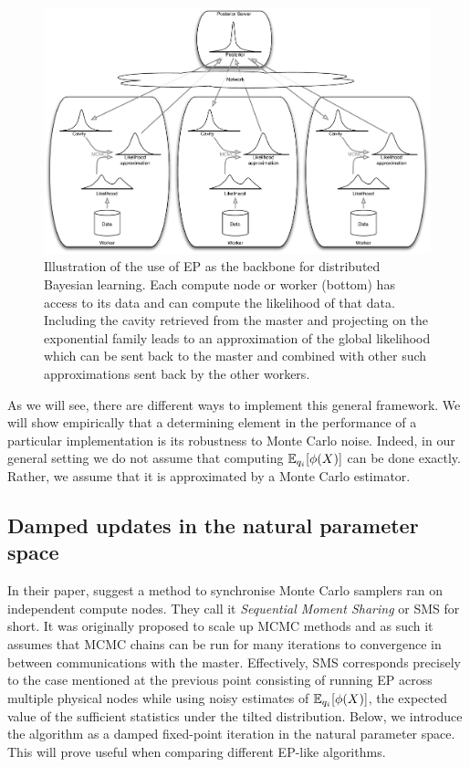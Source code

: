 \begin{figure}[!h]
	\center
	\includegraphics[width=\textwidth]{figures/snep/PosteriorServer}
	\caption{\label{fig:SNEP-arch} Illustration of the use of EP as the backbone for distributed Bayesian learning. Each compute node or worker (bottom) has access to its data and can compute the likelihood of that data. Including the cavity retrieved from the master and projecting on the exponential family leads to an approximation of the global likelihood which can be sent back to the master and combined with other such approximations sent back by the other workers.}
\end{figure}

As we will see, there are different ways to implement this general framework.
We will show empirically that a determining element in the performance of a particular implementation is its robustness to Monte Carlo noise. 
Indeed, in our general setting we do not assume that computing $\mathbb E_{q_i}[\phi(X)]$ can be done exactly. Rather, we assume that it is approximated by a Monte Carlo estimator.

\subsection{Damped updates in the natural parameter space}
In their paper, \citet{xu14} suggest a method to synchronise Monte Carlo samplers ran on independent compute nodes. They call it \emph{Sequential Moment Sharing} or SMS for short. It was originally proposed to scale up MCMC methods and as such it assumes that MCMC chains can be run for many iterations to convergence in between communications with the master. Effectively, SMS corresponds precisely to the case mentioned at the previous point consisting of running EP across multiple physical nodes while using noisy estimates of $\mathbb E_{q_i}[\phi(X)]$, the expected value of the sufficient statistics under the tilted distribution. 
Below, we introduce the algorithm as a damped fixed-point iteration in the natural parameter space. This will prove useful when comparing different EP-like algorithms.

